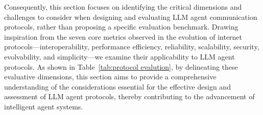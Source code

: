 \documentclass[10pt,preprint]{article}
\begin{document}
Consequently, this section focuses on identifying the critical dimensions and challenges to consider when designing and evaluating LLM agent communication protocols, rather than proposing a specific evaluation benchmark. Drawing inspiration from the seven core metrics observed in the evolution of internet protocols—interoperability, performance efficiency, reliability, scalability, security, evolvability, and simplicity—we examine their applicability to LLM agent protocols. 
As shown in Table~\ref{tab:protocol evalution}, by delineating these evaluative dimensions, this section aims to provide a comprehensive understanding of the considerations essential for the effective design and assessment of LLM agent protocols, thereby contributing to the advancement of intelligent agent systems.
\end{document}
